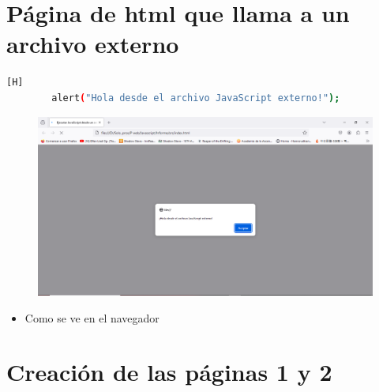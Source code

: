\documentclass{article}
\begin{document}
\section{Página de html que llama a un archivo externo}
	
	\begin{lstlisting}[language=bash,caption={Código del JavaScript}][H]
		alert("Hola desde el archivo JavaScript externo!");
	\end{lstlisting}
	\begin{figure}[H]
		\centering
		\includegraphics[width=1.0\textwidth,keepaspectratio]{img/HtmlExterno.PNG}
	\end{figure}
	\begin{itemize}
		\item Como se ve en el navegador
	\end{itemize}  

\section{Creación de las páginas 1 y 2}
\end{document}
